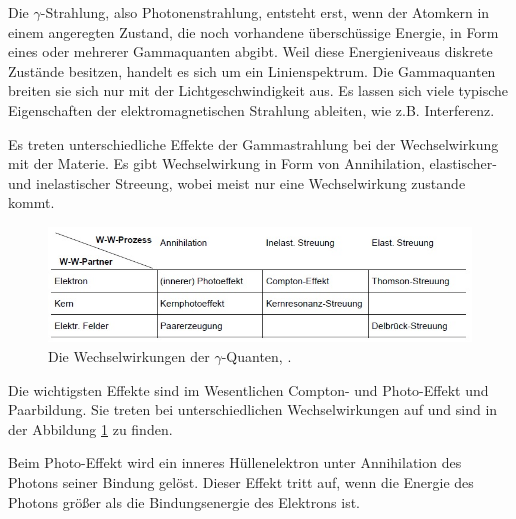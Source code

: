 Die $\gamma$-Strahlung, also Photonenstrahlung, entsteht erst, wenn der Atomkern in einem angeregten Zustand, die noch vorhandene überschüssige Energie, in Form eines oder mehrerer Gammaquanten abgibt. Weil diese Energieniveaus diskrete Zustände besitzen, handelt es sich um ein Linienspektrum. Die Gammaquanten breiten sie sich nur mit der Lichtgeschwindigkeit aus. Es lassen sich viele typische Eigenschaften der elektromagnetischen Strahlung ableiten, wie z.B. Interferenz.

Es treten unterschiedliche Effekte der Gammastrahlung bei der Wechselwirkung mit der Materie. Es gibt Wechselwirkung in Form von Annihilation, elastischer- und inelastischer Streeung, wobei meist nur eine Wechselwirkung zustande kommt. 

\begin{figure}[h!]
	\centering
	\includegraphics[width=0.9\linewidth]{WechselwirkungMaterieGamma.jpg}
	\caption{Die Wechselwirkungen der $\gamma$-Quanten, \cite[4]{anleitung704}.}
	\label{fig:wechselwirkungmateriegamma}
\end{figure}

Die wichtigsten Effekte sind im Wesentlichen Compton- und Photo-Effekt und Paarbildung. Sie treten bei unterschiedlichen Wechselwirkungen auf und sind in der Abbildung \ref{fig:wechselwirkungmateriegamma} zu finden. 

Beim Photo-Effekt wird ein inneres Hüllenelektron unter Annihilation des Photons seiner Bindung gelöst. Dieser Effekt tritt auf, wenn die Energie des Photons größer als die Bindungsenergie des Elektrons ist.

